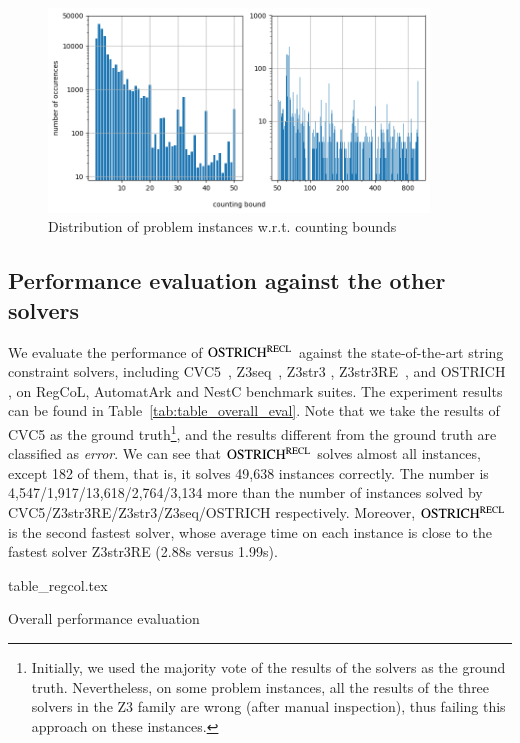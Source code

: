 %
\begin{figure}
  \centering\vskip 0pt
  \includegraphics[width=0.9\textwidth]{counting_distribution.png}  
  \caption{Distribution of problem instances w.r.t. counting bounds}  
  \label{fig:count_distri}
\end{figure}

\subsection{Performance evaluation against the other solvers}\label{subsec:overall_eval}

We evaluate the performance of $\rm OSTRICH^{RECL}$ against the state-of-the-art string constraint solvers, including CVC5~\cite{cvc5}, Z3seq~\cite{z3seq}, Z3str3 \cite{Z3-str3}, Z3str3RE~\cite{BD+23}, and OSTRICH \cite{CHL+19}, on RegCoL, AutomatArk and NestC benchmark suites. 
The experiment results can be found in Table~\ref{tab:table_overall_eval}. Note that we take the results of CVC5 as the ground truth\footnote{Initially,  we used the majority vote of the results of the solvers as the ground truth. Nevertheless, on some problem instances, all the results of the three solvers in the Z3 family are wrong (after manual inspection), thus failing this approach on these instances.}, and the results different from the ground truth are classified as \emph{error}. We can see that $\rm OSTRICH^{RECL}$ solves almost all instances, except 182 of them, that is, it solves 49,638 instances correctly. The number is 4,547/1,917/13,618/2,764/3,134 more than the number of instances solved by CVC5/Z3str3RE/Z3str3/Z3seq/OSTRICH respectively.
%
Moreover, $\rm OSTRICH^{RECL}$ is the second fastest solver, whose average time on each instance is close to the fastest solver Z3str3RE (2.88s versus 1.99s). 

\begin{table}[htbp]
  \centering\vskip 0pt
    {table_regcol.tex}
    \caption{Overall performance evaluation}
  \label{tab:table_overall_eval}
\end{table}

